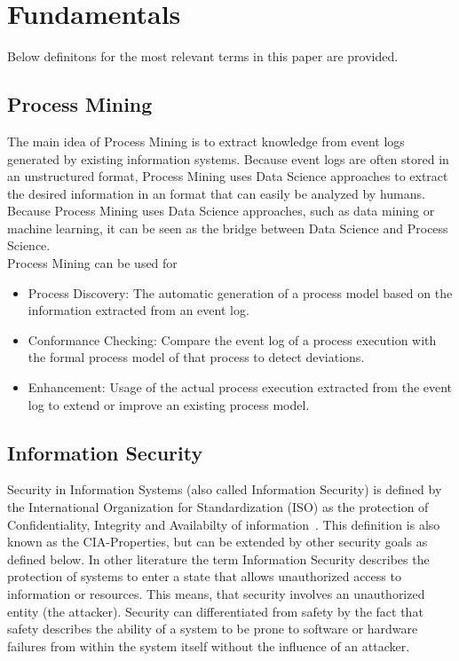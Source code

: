 \documentclass[runningheads]{llncs}
\begin{document}
\section{Fundamentals}\label{Fundamentals}
Below definitons for the most relevant terms in this paper are provided.
\subsection{Process Mining}\label{Process Mining}
The main idea of Process Mining is to extract knowledge from event logs generated by existing information systems. Because event logs are often stored in an unstructured format, Process Mining uses Data Science approaches to
extract the desired information in an format that can easily be analyzed by humans.\cite{vanderAalst2016} Because Process Mining uses Data Science approaches, such as data mining or machine learning, it can be seen as the bridge between Data Science and Process Science.\\
Process Mining can be used for
\begin{itemize}
    \item Process Discovery: The automatic generation of a process model based on the information extracted from an event log.
    \item Conformance Checking: Compare the event log of a process execution with the formal process model of that process to detect deviations.
    \item Enhancement: Usage of the actual process execution extracted from the event log to extend or improve an existing process model.
\end{itemize}

\subsection{Information Security}\label{Security}
Security in Information Systems (also called Information Security) is defined by the International Organization for Standardization (ISO) as the protection of
Confidentiality, Integrity and Availabilty of information~\cite{ISO}. This definition is also known as the CIA-Properties, but can be extended by other security goals as defined below. In other
literature the term Information Security describes the protection of systems to enter a state that allows unauthorized access to information or resources. This means, that security involves an
unauthorized entity (the attacker). Security can differentiated from safety by the fact that safety describes the ability of a system to be prone to software or hardware failures from within
the system itself without the influence of an attacker.\cite{Eckert}\\
\end{document}
